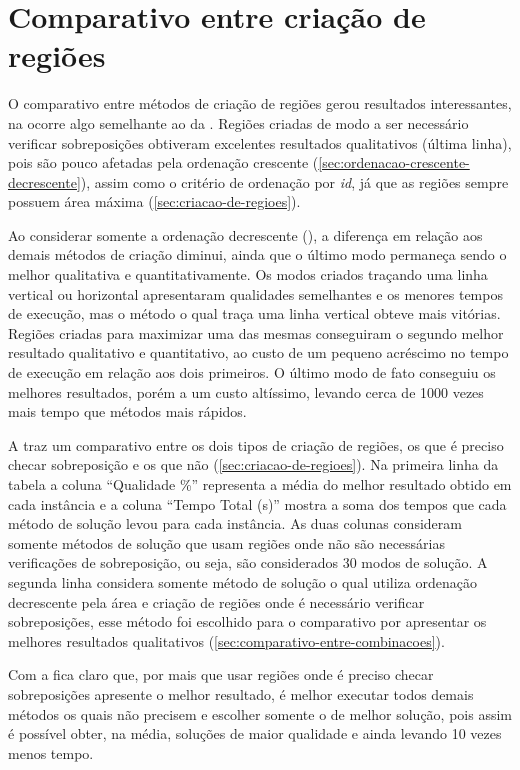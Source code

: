 \section{Comparativo entre criação de regiões}\label{sec:comparativo-entre-criacao-de-regioes}

O comparativo entre métodos de criação de regiões gerou resultados interessantes,
na  ocorre algo semelhante ao da .
Regiões criadas de modo a ser necessário verificar sobreposições obtiveram excelentes resultados
qualitativos (última linha), pois são pouco afetadas pela ordenação crescente
(\cref{sec:ordenacao-crescente-decrescente}), assim como o critério de ordenação por \textit{id},
já que as regiões sempre possuem área máxima (\cref{sec:criacao-de-regioes}).



Ao considerar somente a ordenação decrescente (), a diferença em relação
aos demais métodos de criação diminui, ainda que o último modo permaneça sendo o melhor qualitativa
e quantitativamente.
Os modos criados traçando uma linha vertical ou horizontal apresentaram qualidades semelhantes e
os menores tempos de execução, mas o método o qual traça uma linha vertical obteve mais vitórias.
Regiões criadas para maximizar uma das mesmas conseguiram o segundo melhor resultado qualitativo e
quantitativo, ao custo de um pequeno acréscimo no tempo de execução em relação aos dois primeiros.
O último modo de fato conseguiu os melhores resultados, porém a um custo altíssimo, levando cerca
de 1000 vezes mais tempo que métodos mais rápidos.



A  traz um comparativo entre os dois tipos de criação de regiões,
os que é preciso checar sobreposição e os que não (\cref{sec:criacao-de-regioes}).
Na primeira linha da tabela a coluna “Qualidade \%” representa a média do melhor resultado obtido
em cada instância e a coluna “Tempo Total (s)” mostra a soma dos tempos que cada método de solução
levou para cada instância.
As duas colunas consideram somente métodos de solução que usam regiões onde não são necessárias
verificações de sobreposição, ou seja, são considerados 30 modos de solução.
A segunda linha considera somente método de solução o qual utiliza ordenação decrescente pela área
e criação de regiões onde é necessário verificar sobreposições, esse método foi escolhido para o
comparativo por apresentar os melhores resultados qualitativos (\cref{sec:comparativo-entre-combinacoes}).



Com a  fica claro que, por mais que usar regiões onde é preciso checar
sobreposições apresente o melhor resultado, é melhor executar todos demais métodos os quais não
precisem e escolher somente o de melhor solução, pois assim é possível obter, na média, soluções
de maior qualidade e ainda levando 10 vezes menos tempo.